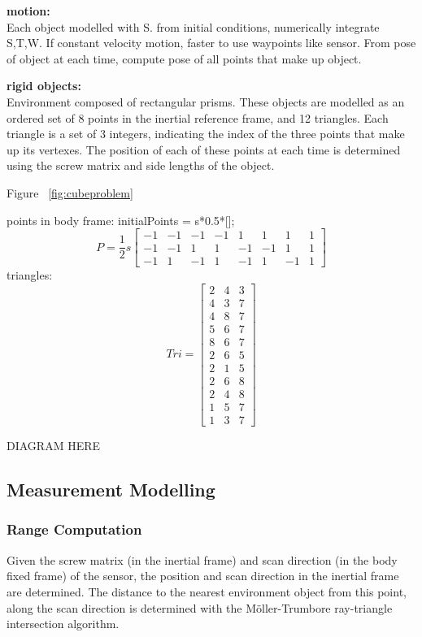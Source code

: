 \textbf{motion:}\\
Each object modelled with S. from initial conditions, numerically integrate S,T,W. If constant velocity motion, faster to use waypoints like sensor.
From pose of object at each time, compute pose of all points that make up object.

\textbf{rigid objects:}\\
Environment composed of rectangular prisms. These objects are modelled as an ordered set of 8 points in the inertial reference frame, and 12 triangles. Each triangle is a set of 3 integers, indicating the index of the three points that make up its vertexes.
The position of each of these points at each time is determined using the screw matrix and side lengths of the object.

Figure ~\ref{fig:cubeproblem}


points in body frame:
initialPoints = s*0.5*[];
\begin{equation}
	P = \frac{1}{2}s
	\begin{bmatrix}
		-1  &  -1  &  -1  &  -1  &   1  &   1  &   1  &  1 \\
		-1  &  -1  &   1  &   1  &  -1  &  -1  &   1  &  1 \\
		-1  &   1  &  -1  &   1  &  -1  &   1  &  -1  &  1 
	\end{bmatrix}
\end{equation}
triangles:
\begin{equation}
	Tri = 
	\begin{bmatrix}
	2 & 4 & 3 \\
    4 & 3 & 7 \\
    4 & 8 & 7 \\
    5 & 6 & 7 \\
    8 & 6 & 7 \\
    2 & 6 & 5 \\
    2 & 1 & 5 \\
    2 & 6 & 8 \\
    2 & 4 & 8 \\
    1 & 5 & 7 \\
    1 & 3 & 7
	\end{bmatrix}
\end{equation}

DIAGRAM HERE

\subsection{Measurement Modelling}
	\subsubsection{Range Computation}
	Given the screw matrix (in the inertial frame) and scan direction (in the body fixed frame) of the sensor, the position and scan direction in the inertial frame are determined.
	The distance to the nearest environment object from this point, along the scan direction is determined with the M{\"o}ller-Trumbore ray-triangle intersection algorithm.

